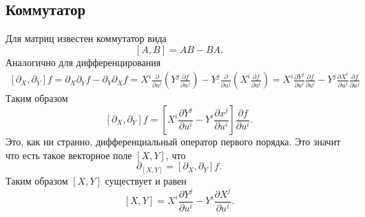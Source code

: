 \subsection{Коммутатор}

Для матриц известен коммутатор вида
$$
    \left[A, B\right] = AB - BA.
$$
Аналогично для дифференцирования
\begin{align*}
    \left[\partial_X, \partial_Y \right] f
    =
    \partial_X \partial_Y f - \partial_Y \partial_X f 
    =
    X^i \frac{\partial }{\partial u^i}
     \left(Y^j \frac{\partial f}{\partial u^j} \right)
    -
    Y^j \frac{\partial }{\partial u^j} 
    \left(X^i \frac{\partial f}{\partial u^i} \right) 
    = X^i \frac{\partial Y^j}{\partial u^i} \frac{\partial f}{\partial u^i} 
    -
    Y^j \frac{\partial X^i}{\partial u^j} \frac{\partial f}{\partial u^j}
\end{align*}
Таким образом
\begin{equation}
    \left[\partial_X, \partial_Y \right] f
    =
    \left[
        X^i \frac{\partial Y^j}{\partial u^i} - Y^i \frac{\partial x^j}{\partial u^i} 
    \right] \frac{\partial f}{\partial u^i} .
\end{equation}
Это, как ни странно, дифференциальный оператор первого порядка. Это значит что есть такое векторное поле $\left[X, Y\right]$, что
$$
    \partial_{\left[X, Y\right]} = \left[\partial_X, \partial_Y\right] f.
$$
Таким образом $\left[X, Y\right]$ существует и равен
\begin{equation}
    \left[X, Y\right] =   X^i \frac{\partial Y^j}{\partial u^i} - Y^i \frac{\partial X^j}{\partial u^i}.
\end{equation}
